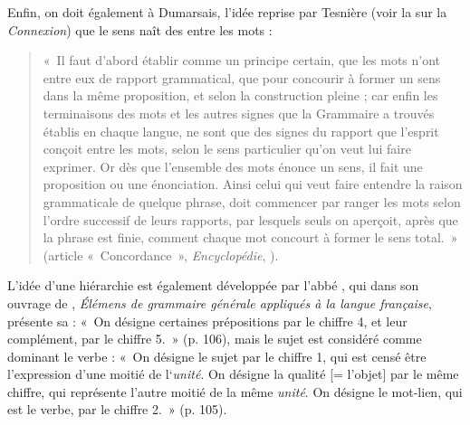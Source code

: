 {    Enfin, on doit également à Dumarsais, l’idée reprise par Tesnière (voir la  sur la \textit{Connexion}) que le sens naît des  entre les mots : 
    \begin{quote}«~Il faut d’abord établir comme un principe certain, que les mots n’ont entre eux de rapport grammatical, que pour concourir à former un sens dans la même proposition, et selon la construction pleine ; car enfin les terminaisons des mots et les autres signes que la Grammaire a trouvés établis en chaque langue, ne sont que des signes du rapport que l’esprit conçoit entre les mots, selon le sens particulier qu’on veut lui faire exprimer. Or dès que l’ensemble des mots énonce un sens, il fait une proposition ou une énonciation. Ainsi celui qui veut faire entendre la raison grammaticale de quelque phrase, doit commencer par ranger les mots selon l’ordre successif de leurs rapports, par lesquels seuls on aperçoit, après que la phrase est finie, comment chaque mot concourt à former le sens total.~» (article «~Concordance~», \textit{Encyclopédie}, \citeyear{Dumarsais1753}). \end{quote}

    L’idée d’une hiérarchie est également développée par l’abbé  , qui dans son ouvrage de \citeyear{sicard1801elemens}, \textit{Élémens de grammaire générale appliqués à la langue française}, présente sa : «~On désigne certaines prépositions par le chiffre 4, et leur complément, par le chiffre 5.~» (p. 106), mais le sujet est considéré comme dominant le verbe : «~On désigne le sujet par le chiffre 1, qui est censé être l’expression d’une moitié de l‘\textit{unité}. On désigne la qualité [= l’objet] par le même chiffre, qui représente l’autre moitié de la même \textit{unité}. On désigne le mot-lien, qui est le verbe, par le chiffre 2.~» (p. 105).

}
